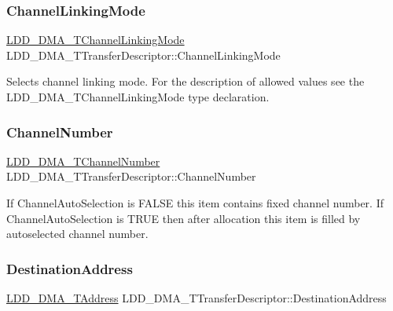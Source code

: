 \subsubsection{\texorpdfstring{Channel\+Linking\+Mode}{ChannelLinkingMode}}
{\footnotesize\ttfamily \hyperlink{group___p_e___types__module_ga7a25c76afefd56aca723c89d7098c89b}{L\+D\+D\+\_\+\+D\+M\+A\+\_\+\+T\+Channel\+Linking\+Mode} L\+D\+D\+\_\+\+D\+M\+A\+\_\+\+T\+Transfer\+Descriptor\+::\+Channel\+Linking\+Mode}

Selects channel linking mode. For the description of allowed values see the L\+D\+D\+\_\+\+D\+M\+A\+\_\+\+T\+Channel\+Linking\+Mode type declaration. \mbox{\label{struct_l_d_d___d_m_a___t_transfer_descriptor_a22d5f3770a3c62c4bb7e426b4d5d96c8}} 
\subsubsection{\texorpdfstring{Channel\+Number}{ChannelNumber}}
{\footnotesize\ttfamily \hyperlink{group___p_e___types__module_gad268d607015891269cb015faa8bc0dac}{L\+D\+D\+\_\+\+D\+M\+A\+\_\+\+T\+Channel\+Number} L\+D\+D\+\_\+\+D\+M\+A\+\_\+\+T\+Transfer\+Descriptor\+::\+Channel\+Number}

If Channel\+Auto\+Selection is F\+A\+L\+SE this item contains fixed channel number. If Channel\+Auto\+Selection is T\+R\+UE then after allocation this item is filled by autoselected channel number. \mbox{\label{struct_l_d_d___d_m_a___t_transfer_descriptor_a36982f9f85fdeab04f7942d173f9bcb7}} 
\subsubsection{\texorpdfstring{Destination\+Address}{DestinationAddress}}
{\footnotesize\ttfamily \hyperlink{group___p_e___types__module_gab8287f62db7ff96992355760b652cd07}{L\+D\+D\+\_\+\+D\+M\+A\+\_\+\+T\+Address} L\+D\+D\+\_\+\+D\+M\+A\+\_\+\+T\+Transfer\+Descriptor\+::\+Destination\+Address}

